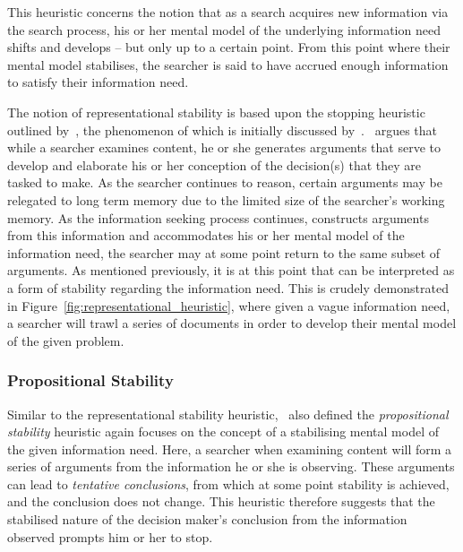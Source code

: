 This heuristic concerns the notion that as a search acquires new information via the search process, his or her mental model of the underlying information need shifts and develops -- but only up to a certain point. From this point where their mental model stabilises, the searcher is said to have accrued enough information to satisfy their information need.

The notion of representational stability is based upon the stopping heuristic outlined by~\cite{nickles1995judgment}, the phenomenon of which is initially discussed by~\cite{yates1982toward}.~\cite{nickles1995judgment} argues that while a searcher examines content, he or she generates arguments that serve to develop and elaborate his or her conception of the decision(s) that they are tasked to make. As the searcher continues to reason, certain arguments may be relegated to long term memory due to the limited size of the searcher's working memory. As the information seeking process continues, constructs arguments from this information and accommodates his or her mental model of the information need, the searcher may at some point return to the same subset of arguments. As mentioned previously, it is at this point that can be interpreted as a form of stability regarding the information need. This is crudely demonstrated in Figure~\ref{fig:representational_heuristic}, where given a vague information need, a searcher will trawl a series of documents in order to develop their mental model of the given problem.

\subsubsection{Propositional Stability}
Similar to the representational stability heuristic,~\cite{nickles1995judgment} also defined the \emph{propositional stability} heuristic again focuses on the concept of a stabilising mental model of the given information need. Here, a searcher when examining content will form a series of arguments from the information he or she is observing. These arguments can lead to \emph{tentative conclusions}, from which at some point stability is achieved, and the conclusion does not change. This heuristic therefore suggests that the stabilised nature of the decision maker's conclusion from the information observed prompts him or her to stop.

